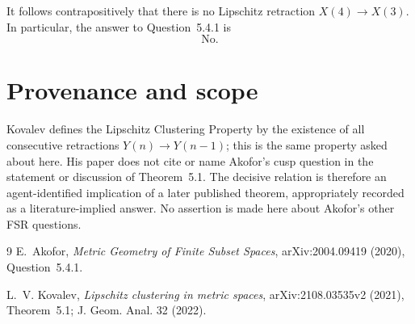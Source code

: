 \documentclass[11pt]{article}
\begin{document}
It follows contrapositively that there is no Lipschitz retraction
$X(4)\to X(3)$.  In particular, the answer to Question~5.4.1 is
\[
 \boxed{\text{No.}}
\]

\section{Provenance and scope}

Kovalev defines the Lipschitz Clustering Property by the existence of all
consecutive retractions $Y(n)\to Y(n-1)$; this is the same property asked
about here.  His paper does not cite or name Akofor's cusp question in the
statement or discussion of Theorem~5.1.  The decisive relation is therefore
an agent-identified implication of a later published theorem, appropriately
recorded as a literature-implied answer.  No assertion is made here about
Akofor's other FSR questions.

\begin{thebibliography}{9}
E.~Akofor,
\emph{Metric Geometry of Finite Subset Spaces},
arXiv:2004.09419 (2020), Question~5.4.1.

L.~V. Kovalev,
\emph{Lipschitz clustering in metric spaces},
arXiv:2108.03535v2 (2021), Theorem~5.1;
J. Geom. Anal. 32 (2022).
\end{thebibliography}
\end{document}
